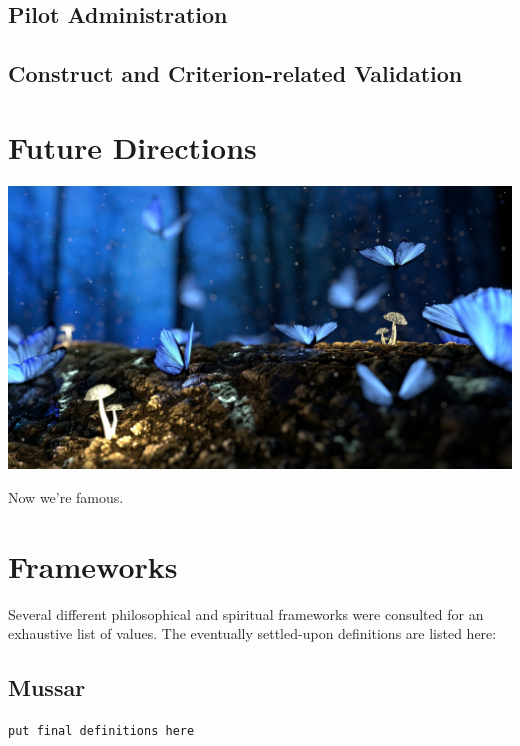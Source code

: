 \documentclass[
]{book}
\begin{document}
\hypertarget{pilot-administration}{%
\section{Pilot Administration}\label{pilot-administration}}

\hypertarget{construct-and-criterion-related-validation}{%
\section{Construct and Criterion-related Validation}\label{construct-and-criterion-related-validation}}

\hypertarget{future-directions}{%
\chapter{Future Directions}\label{future-directions}}

\includegraphics{fantasy-g653fba516_1920.jpg}

Now we're famous.

\hypertarget{appendix-appendices}{%
\appendix}


\hypertarget{frameworks}{%
\chapter{Frameworks}\label{frameworks}}

Several different philosophical and spiritual frameworks were consulted for an exhaustive list of values. The eventually settled-upon definitions are listed here:

\hypertarget{mussar}{%
\section{Mussar}\label{mussar}}

\texttt{put\ final\ definitions\ here}

  
\end{document}
